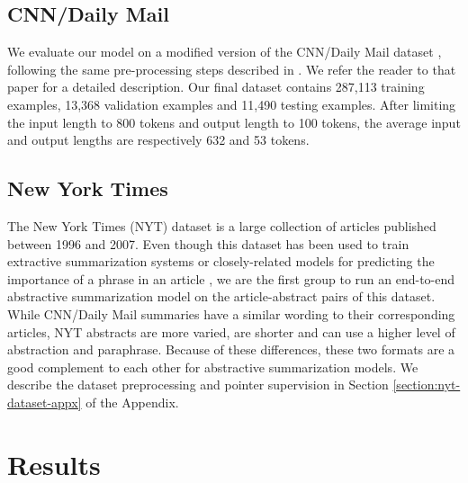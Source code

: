 \documentclass{article} \usepackage{iclr2018_arxiv,times}
\begin{document}
\subsection{CNN/Daily Mail}

We evaluate our model on a modified version of the CNN/Daily Mail dataset \citep{hermann2015}, following the same pre-processing steps described in \citet{nallapati2016}. We refer the reader to that paper for a detailed description. Our final dataset contains 287,113 training examples, 13,368 validation examples and 11,490 testing examples. After limiting the input length to 800 tokens and output length to 100 tokens, the average input and output lengths are respectively 632 and 53 tokens.

\subsection{New York Times}

The New York Times (NYT) dataset \citep{sandhaus2008} is a large collection of articles published between 1996 and 2007. Even though this dataset has been used to train extractive summarization systems \citep{durrett2016learning,hong2014,li2016} or closely-related models for predicting the importance of a phrase in an article \citep{yang2014,nye2015,hong2015}, we are the first group to run an end-to-end abstractive summarization model on the article-abstract pairs of this dataset. While CNN/Daily Mail summaries have a similar wording to their corresponding articles, NYT abstracts are more varied, are shorter and can use a higher level of abstraction and paraphrase. Because of these differences, these two formats are a good complement to each other for abstractive summarization models. We describe the dataset preprocessing and pointer supervision in Section \ref{section:nyt-dataset-appx} of the Appendix.

\section{Results}
\label{sec:results}
\end{document}
